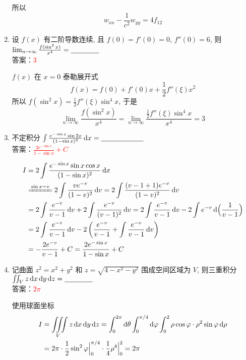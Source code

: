 \documentclass[11pt,twoside,space]{ctexart}
\begin{document}
\begin{enumerate}[labelsep=-1em,leftmargin=1.4em,align=left]
\begin{Solution}
所以\[w_{xx}-\frac{1}{c^2}w_{yy}=4f_{12}\]
\end{Solution}
\item 设 $f(x)$ 有二阶导数连续, 且 $f(0)=f'(0)=0$, $f''(0)=6$, 则 $\lim_{n\to\infty}\frac{f(\sin^2x)}{x^4}=\underline{\hspace*{4em}}$\\[2mm]
{\kaishu 答案}：\textcolor{red}{$3$}
\begin{Solution}
$f(x)$ 在 $x=0$ 泰勒展开式 \[f(x)=f(0)+f'(0)x+\frac{1}{2}f''(\xi)x^2\]
所以 $f(\sin^2x)=\frac{1}{2}f''(\xi)\sin^4x$, 
于是\[\lim_{n\to\infty}\frac{f(\sin^2x)}{x^4}=\lim_{n\to\infty}\frac{\frac{1}{2}f''(\xi)\sin^4x}{x^4}=3\]
\end{Solution}
\item 不定积分 $\int\frac{e^{-\sin x}\sin2x}{(1-\sin x)^2}\mathop{}\!\mathrm{d} x=\underline{\hspace*{6em}}$\\[2mm]
{\kaishu 答案}：\textcolor{red}{$\frac{2e^{-\sin x}}{1-\sin x}+C$}
\begin{Solution}\vspace*{-1em}
\begin{align*}
I&=2\int\frac{e^{-\sin x}\sin x\cos x}{(1-\sin x)^2}\dif x\\
&\xlongequal{\sin x=v}2\int\frac{ve^{-v}}{(1-v)^2}\dif v=2\int\frac{(v-1+1)e^{-v}}{(1-v)^2}\dif v\\
&=2\int\frac{e^{-v}}{v-1}\dif v+2\int\frac{e^{-v}}{(v-1)^2}\dif v=2\int\frac{e^{-v}}{v-1}\dif v-2\int e^{-v}\dif\Big(\frac{1}{v-1}\Big)\\
&=2\int\frac{e^{-v}}{v-1}\dif v-2\left(\frac{e^{-v}}{v-1}+\int\frac{e^{-v}}{v-1}\dif v\right)\\
&=-\frac{2e^{-v}}{v-1}+C=\frac{2e^{-\sin x}}{1-\sin x}+C
\end{align*}
\end{Solution}
\newpage
\item 记曲面 $z^2=x^2+y^2$ 和 $z=\sqrt{4-x^2-y^2}$ 围成空间区域为 $V$, 则三重积分 $\iint_Vz\mathop{}\!\mathrm{d} x\mathop{}\!\mathrm{d} y\mathop{}\!\mathrm{d} z=\underline{\hspace*{4em}}$\\[2mm]
{\kaishu 答案}：\textcolor{red}{$2\pi$}
\begin{Solution}
使用球面坐标
\begin{align*}
I&=\iiint\limits_Vz\mathop{}\!\mathrm{d} x\mathop{}\!\mathrm{d} y\mathop{}\!\mathrm{d} z=\int_{0}^{2\pi}\mathop{}\!\mathrm{d}\theta\int_{0}^{\pi/4}\mathop{}\!\mathrm{d}\varphi\int_0^2\rho\cos\varphi\cdot\rho^2\sin\varphi\mathop{}\!\mathrm{d}\rho\\
&=2\pi\cdot\frac{1}{2}\sin^2\varphi\Big|_0^{\pi/4}\cdot\frac{1}{4}\rho^4\Big|_0^2=2\pi
\end{align*}
\end{Solution}
\end{enumerate}
\end{document}
